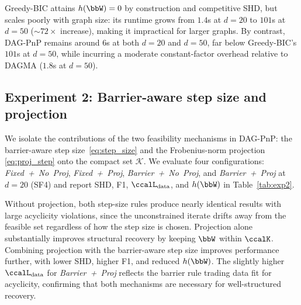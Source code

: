 \documentclass[conference]{IEEEtran}
\newcommand{\Ldata}{\ccalL_{\mathrm{data}}}
\newcommand{\sms}[1]{{\color{cyan}{[SS: #1]}}}
\newcommand{\ali}[1]{{\color{blue}{[ali: #1]}}}
\begin{document}
    Greedy-BIC attains $h(\bbW)=0$ by construction and competitive SHD,
    but scales poorly with graph size: its runtime grows from $1.4$s at
    $d=20$ to $101$s at $d=50$ (${\sim}72{\times}$ increase), making it
    impractical for larger graphs. By contrast, DAG-PnP remains around
    $6$s at both $d=20$ and $d=50$, far below Greedy-BIC's $101$s at
    $d=50$, while incurring a moderate constant-factor overhead relative
    to DAGMA ($1.8$s at $d=50$). 
    

    
    \subsection{Experiment 2: Barrier-aware step size and projection}
    \label{ssec:exp2}
    
    We isolate the contributions of the two feasibility mechanisms in DAG-PnP:
    the barrier-aware step size~\eqref{eq:step_size} and the
    Frobenius-norm projection \eqref{eq:proj_step} onto the compact set $\mathcal{K}$.
    We evaluate four configurations: \emph{Fixed~+~No~Proj},
    \emph{Fixed~+~Proj}, \emph{Barrier~+~No~Proj}, and
    \emph{Barrier~+~Proj} at $d=20$ (SF4) and report SHD, F1,
    $\Ldata$, and $h(\bbW)$ in Table~\ref{tab:exp2}.
    
    Without projection, both step-size rules produce nearly identical results with large acyclicity violations, since the unconstrained iterate drifts away from the feasible set regardless of how the step size is chosen.
    Projection alone substantially improves structural recovery by keeping $\bbW$ within $\ccalK$. Combining
    projection with the barrier-aware step size improves performance
    further, with lower SHD, higher F1, and reduced $h(\bbW)$. The
    slightly higher $\Ldata$ for \emph{Barrier~+~Proj} reflects the barrier
    rule trading data fit for acyclicity, confirming that both mechanisms
    are necessary for well-structured recovery.
    
\end{document}
